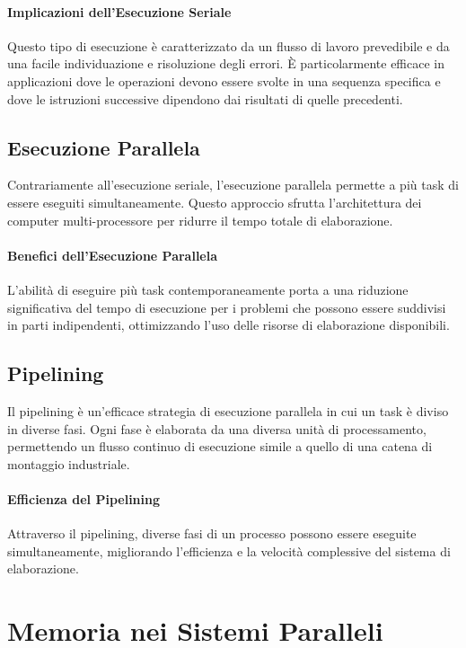 \paragraph{Implicazioni dell'Esecuzione Seriale}
Questo tipo di esecuzione è caratterizzato da un flusso di lavoro prevedibile e da una facile individuazione e risoluzione degli errori. È particolarmente efficace in applicazioni dove le operazioni devono essere svolte in una sequenza specifica e dove le istruzioni successive dipendono dai risultati di quelle precedenti.

\subsection{Esecuzione Parallela}
Contrariamente all'esecuzione seriale, l'esecuzione parallela permette a più task di essere eseguiti simultaneamente. Questo approccio sfrutta l'architettura dei computer multi-processore per ridurre il tempo totale di elaborazione.

\paragraph{Benefici dell'Esecuzione Parallela}
L'abilità di eseguire più task contemporaneamente porta a una riduzione significativa del tempo di esecuzione per i problemi che possono essere suddivisi in parti indipendenti, ottimizzando l'uso delle risorse di elaborazione disponibili.

\subsection{Pipelining}
Il pipelining è un'efficace strategia di esecuzione parallela in cui un task è diviso in diverse fasi. Ogni fase è elaborata da una diversa unità di processamento, permettendo un flusso continuo di esecuzione simile a quello di una catena di montaggio industriale.

\paragraph{Efficienza del Pipelining}
Attraverso il pipelining, diverse fasi di un processo possono essere eseguite simultaneamente, migliorando l'efficienza e la velocità complessive del sistema di elaborazione.

\section{Memoria nei Sistemi Paralleli}

